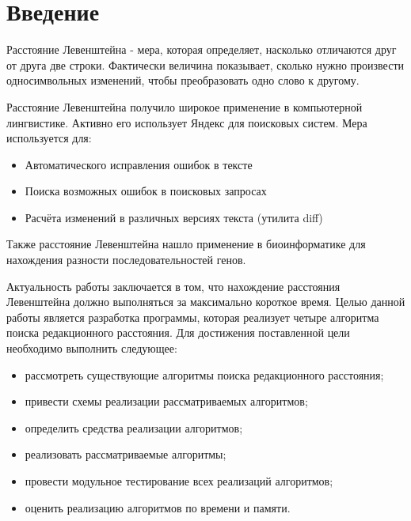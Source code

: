 \newpage
{}

\chapter*{Введение}
Расстояние Левенштейна\cite{Levenshtein} - мера, которая определяет, насколько отличаются друг от друга две строки. Фактически величина показывает, сколько нужно произвести односимвольных изменений, чтобы преобразовать одно слово к другому.

Расстояние Левенштейна получило широкое применение в компьютерной лингвистике. Активно его использует Яндекс\cite{yandex} для поисковых систем. Мера используется для:
\begin{itemize}
    \item Автоматического исправления ошибок в тексте
    \item Поиска возможных ошибок в поисковых запросах
    \item Расчёта изменений в различных версиях текста (утилита diff)
\end{itemize}

Также расстояние Левенштейна нашло применение в биоинформатике для нахождения разности последовательностей генов.\cite{bio}

Актуальность работы заключается в том, что нахождение расстояния Левенштейна должно выполняться за максимально короткое время.
Целью данной работы является разработка программы, которая реализует четыре алгоритма поиска редакционного расстояния. 
Для достижения поставленной цели необходимо выполнить следующее:
\begin{itemize}
\item рассмотреть существующие алгоритмы поиска редакционного расстояния;
\item привести схемы реализации рассматриваемых алгоритмов;
\item определить средства реализации алгоритмов;
\item реализовать рассматриваемые алгоритмы;
\item провести модульное тестирование всех реализаций алгоритмов;
\item оценить реализацию алгоритмов по времени и памяти.
\end{itemize}